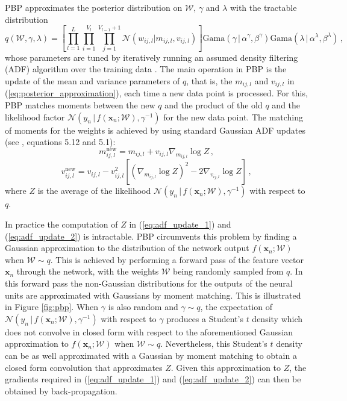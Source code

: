 PBP approximates the posterior distribution on $\mathcal{W}$, $\gamma$ and $\lambda$ with the tractable distribution
\begin{equation}
q(\mathcal{W},\gamma, \lambda) = \left[ \prod_{l=1}^L\! \prod_{i=1}^{V_l}\! 
\prod_{j=1}^{V_{l\!-\!1}\!+\!1} \mathcal{N}(w_{ij,l}| m_{ij,l},v_{ij,l})\right ]
 \text{Gama}(\gamma \,|\, \alpha^\gamma, \beta^\gamma)
\text{Gama}(\lambda \,|\, \alpha^\lambda, \beta^\lambda)\,,\label{eq:posterior_approximation}
\end{equation}
whose parameters are tuned by iteratively running an assumed density filtering (ADF) algorithm over the training data \cite{Opper1998}. The main operation in PBP is the update of the mean and variance parameters of $q$, that is, the $m_{ij,l}$ and $v_{ij,l}$ in
(\ref{eq:posterior_approximation}), each time a new data point is processed. For this, PBP matches moments between the new $q$ and the product of the old $q$ and the likelihood factor $\mathcal{N}(y_n \,|\, f(\mathbf{x}_n;\mathcal{W}),\gamma^{-1})$ for the new data point. The matching of moments for the weights is achieved by using standard Gaussian ADF updates (see \cite{minka2001family}, equations 5.12 and 5.1):
\begin{equation}
\label{eq:adf_update_1} m_{ij,l}^\text{new} =  m_{ij,l} + v_{ij,l} \nabla_{m_{ij,l}} \log Z \,,
\end{equation}
\begin{equation}
\label{eq:adf_update_2}v_{ij,l}^\text{new} = v_{ij,l} - v_{ij,l}^2 \left[ (\nabla_{m_{ij,l}} \log Z)^2 - 2 \nabla_{v_{ij,l}} \log Z \right]\,,
\end{equation}
where $Z$ is the average of the likelihood $\mathcal{N}(y_n\,|\, f(\mathbf{x}_n;\mathcal{W}),\gamma^{-1})$ with respect to $q$. 

In practice the computation of $Z$ in (\ref{eq:adf_update_1}) and (\ref{eq:adf_update_2}) is intractable. PBP circumvents this problem by finding a Gaussian approximation to the distribution of the network output $f(\mathbf{x}_n;\mathcal{W})$ when $\mathcal{W} \sim q$. This is achieved by performing a forward pass of the feature vector $\mathbf{x}_n$ through the network, with the weights $\mathcal{W}$ being randomly sampled from $q$. In this forward pass the non-Gaussian distributions for the outputs of the neural units are approximated with Gaussians by moment matching. This is illustrated in Figure \ref{fig:pbp}. When $\gamma$ is also random and $\gamma\sim q$, the expectation of $\mathcal{N}(y_n \,|\, f(\mathbf{x}_n;\mathcal{W}),\gamma^{-1})$ with respect to $\gamma$ produces a Student's $t$ density which does not convolve in closed form with respect to the aforementioned Gaussian approximation to $f(\mathbf{x}_n;\mathcal{W})$ when $\mathcal{W} \sim q$. Nevertheless, this Student's $t$ density can be as well approximated with a Gaussian by moment matching to obtain a closed form convolution that approximates $Z$. Given this approximation to $Z$, the gradients required in (\ref{eq:adf_update_1}) and (\ref{eq:adf_update_2}) can then be obtained by back-propagation.

